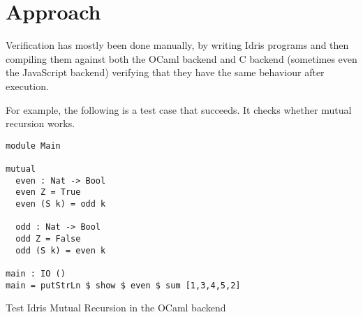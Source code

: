 \section{Approach}

Verification has mostly been done manually, by writing Idris programs
and then compiling them against both the OCaml backend and C backend
(sometimes even the JavaScript backend) verifying that they have the
same behaviour after execution.


For example, the following is a test case that succeeds.
It checks whether mutual recursion works.



\begin{listing}[H]
    \begin{verbatim}
module Main 

mutual
  even : Nat -> Bool
  even Z = True
  even (S k) = odd k

  odd : Nat -> Bool
  odd Z = False
  odd (S k) = even k

main : IO ()
main = putStrLn $ show $ even $ sum [1,3,4,5,2]
    \end{verbatim}
    \caption{Test Idris Mutual Recursion in the OCaml backend}
\end{listing}

